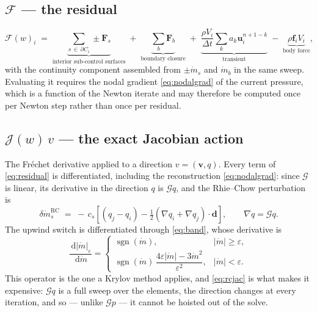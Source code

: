 \documentclass[11pt,a4paper]{article}
\newcommand{\bu}{\mathbf{u}}
\newcommand{\bv}{\mathbf{v}}
\newcommand{\bd}{\mathbf{d}}
\newcommand{\bF}{\mathbf{F}}
\newcommand{\bff}{\mathbf{f}}
\newcommand{\dd}{\,\mathrm{d}}
\newcommand{\mdot}{\dot m}
\begin{document}
\subsection{$\mathcal{F}$ --- the residual}

\begin{equation}
  \mathcal{F}(w)_i \;=\;
  \underbrace{\sum_{s \,\in\, \partial C_i} \pm \bF_s}_{\text{interior sub-control surfaces}}
  \;+\; \underbrace{\sum_{b} \bF_b}_{\text{boundary closure}}
  \;+\; \underbrace{\frac{\rho V_i}{\Delta t}\sum_k a_k \bu_i^{n+1-k}}_{\text{transient}}
  \;-\; \underbrace{\rho \bff_i V_i}_{\text{body force}} ,
  \label{eq:residual}
\end{equation}
with the continuity component assembled from $\pm\mdot_s$ and $\mdot_b$ in the same sweep.
Evaluating it requires the nodal gradient \eqref{eq:nodalgrad} of the current pressure, which
is a function of the Newton iterate and may therefore be computed once per Newton step rather
than once per residual.

\subsection{$\mathcal{J}(w)\,v$ --- the exact Jacobian action}
\label{sec:jacaction}

The Fr\'echet derivative applied to a direction $v = (\bv, q)$. Every term of
\eqref{eq:residual} is differentiated, including the reconstruction \eqref{eq:nodalgrad}:
since $\mathcal{G}$ is linear, its derivative in the direction $q$ is $\mathcal{G} q$, and the
Rhie--Chow perturbation is
\begin{equation}
  \delta \mdot_s^{\mathrm{RC}} \;=\; -\,c_s \left[
    \left( q_j - q_i \right)
    - \tfrac12 \left( \nabla q_i + \nabla q_j \right) \cdot \bd
  \right] ,
  \qquad \nabla q = \mathcal{G} q .
  \label{eq:rcjac}
\end{equation}
The upwind switch is differentiated through \eqref{eq:band}, whose derivative is
\begin{equation}
  \frac{\dd |\mdot|_\varepsilon}{\dd \mdot} =
  \begin{cases}
    \operatorname{sgn}(\mdot) , & |\mdot| \ge \varepsilon , \\[4pt]
    \operatorname{sgn}(\mdot)\,\dfrac{4\varepsilon |\mdot| - 3 \mdot^2}{\varepsilon^2} , & |\mdot| < \varepsilon .
  \end{cases}
\end{equation}
This operator is the one a Krylov method applies, and \eqref{eq:rcjac} is what makes it
expensive: $\mathcal{G}q$ is a full sweep over the elements, the direction changes at every
iteration, and so --- unlike $\mathcal{G}p$ --- it cannot be hoisted out of the solve.
\end{document}
